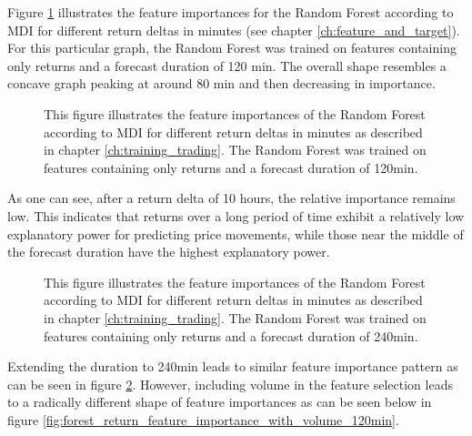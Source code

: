 Figure \ref{fig:forest_return_feature_importance_no_volume_120min} illustrates the feature importances for the Random Forest according to MDI \cite{louppe2015variableImportance}
for different return deltas in minutes (see chapter \ref{ch:feature_and_target}). 
For this particular graph, the Random Forest was trained on features containing only returns and a forecast duration of 120 min.
The overall shape resembles a concave graph peaking at around 80 min and then decreasing in importance.

\begin{figure}[H]
    \captionsetup{format=plain}
    \caption{ 
            This figure illustrates the feature importances of the Random Forest according to MDI \cite{louppe2015variableImportance}
            for different return deltas in minutes as described in chapter \ref{ch:training_trading}. 
            The Random Forest was trained on features containing only returns and a forecast duration of 120min.   
        }
    \label{fig:forest_return_feature_importance_no_volume_120min}
\end{figure}

As one can see, after a return delta of 10 hours, the relative importance remains low. 
This indicates that returns over a long period of time exhibit a relatively low explanatory power for
predicting price movements, while those near the middle of the forecast duration have the highest explanatory power.

\begin{figure}[H]
    \captionsetup{format=plain}
    \caption{ 
            This figure illustrates the feature importances of the Random Forest according to MDI \cite{louppe2015variableImportance}
            for different return deltas in minutes as described in chapter \ref{ch:training_trading}. 
            The Random Forest was trained on features containing only returns and a forecast duration of 240min.
        }
    \label{fig:forest_return_feature_importance_no_volume_240min}
\end{figure}

Extending the duration to 240min leads to similar feature importance pattern as can be seen in figure \ref{fig:forest_return_feature_importance_no_volume_240min}.
However, including volume in the feature selection leads to a radically different shape of feature importances 
as can be seen below in figure \ref{fig:forest_return_feature_importance_with_volume_120min}.

